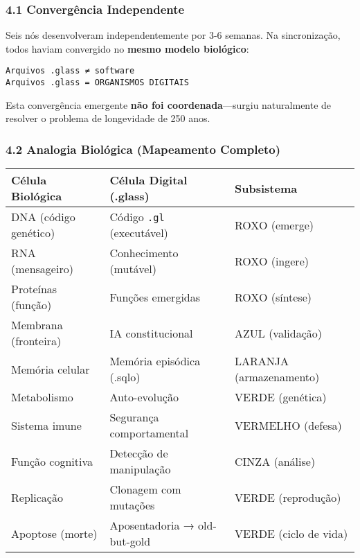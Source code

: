 \documentclass[
]{article}
\begin{document}
\subsubsection{4.1 Convergência
Independente}\label{converguxeancia-independente}

Seis nós desenvolveram independentemente por 3-6 semanas. Na
sincronização, todos haviam convergido no \textbf{mesmo modelo
biológico}:

\begin{verbatim}
Arquivos .glass ≠ software
Arquivos .glass = ORGANISMOS DIGITAIS
\end{verbatim}

Esta convergência emergente \textbf{não foi coordenada}---surgiu
naturalmente de resolver o problema de longevidade de 250 anos.

\subsubsection{4.2 Analogia Biológica (Mapeamento
Completo)}\label{analogia-bioluxf3gica-mapeamento-completo}

{\def\LTcaptype{} %
\begin{longtable}[]{@{}
  >{\raggedright\arraybackslash}p{}
  >{\raggedright\arraybackslash}p{}
  >{\raggedright\arraybackslash}p{}@{}}
\toprule\noalign{}
\begin{minipage}[b]{\linewidth}\raggedright
Célula Biológica
\end{minipage} & \begin{minipage}[b]{\linewidth}\raggedright
Célula Digital (.glass)
\end{minipage} & \begin{minipage}[b]{\linewidth}\raggedright
Subsistema
\end{minipage} \\
\midrule\noalign{}
\endhead
\bottomrule\noalign{}
\endlastfoot
DNA (código genético) & Código \texttt{.gl} (executável) & ROXO
(emerge) \\
RNA (mensageiro) & Conhecimento (mutável) & ROXO (ingere) \\
Proteínas (função) & Funções emergidas & ROXO (síntese) \\
Membrana (fronteira) & IA constitucional & AZUL (validação) \\
Memória celular & Memória episódica (.sqlo) & LARANJA (armazenamento) \\
Metabolismo & Auto-evolução & VERDE (genética) \\
Sistema imune & Segurança comportamental & VERMELHO (defesa) \\
Função cognitiva & Detecção de manipulação & CINZA (análise) \\
Replicação & Clonagem com mutações & VERDE (reprodução) \\
Apoptose (morte) & Aposentadoria → old-but-gold & VERDE (ciclo de
vida) \\
\end{longtable}
}
\end{document}
